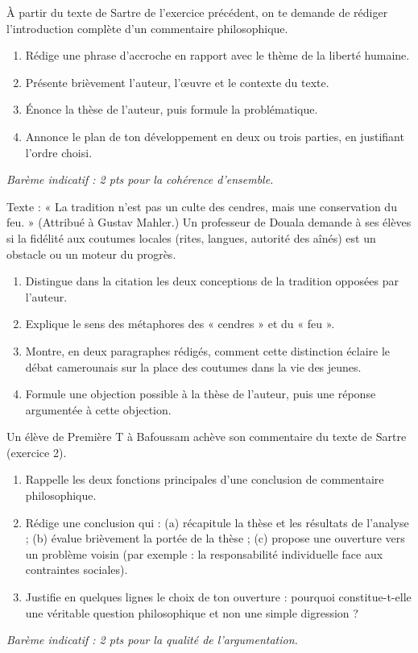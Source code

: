\documentclass[11pt]{article}
\begin{document}
\begin{exercice}
À partir du texte de Sartre de l'exercice précédent, on te demande de rédiger l'introduction complète d'un commentaire philosophique.
\begin{enumerate}
\item Rédige une phrase d'accroche en rapport avec le thème de la liberté humaine.
\item Présente brièvement l'auteur, l'œuvre et le contexte du texte.
\item Énonce la thèse de l'auteur, puis formule la problématique.
\item Annonce le plan de ton développement en deux ou trois parties, en justifiant l'ordre choisi.
\end{enumerate}
\emph{Barème indicatif : 2 pts pour la cohérence d'ensemble.}
\end{exercice}

\begin{exercice}
Texte : « La tradition n'est pas un culte des cendres, mais une conservation du feu. » (Attribué à Gustav Mahler.) Un professeur de Douala demande à ses élèves si la fidélité aux coutumes locales (rites, langues, autorité des aînés) est un obstacle ou un moteur du progrès.
\begin{enumerate}
\item Distingue dans la citation les deux conceptions de la tradition opposées par l'auteur.
\item Explique le sens des métaphores des « cendres » et du « feu ».
\item Montre, en deux paragraphes rédigés, comment cette distinction éclaire le débat camerounais sur la place des coutumes dans la vie des jeunes.
\item Formule une objection possible à la thèse de l'auteur, puis une réponse argumentée à cette objection.
\end{enumerate}
\end{exercice}

\begin{exercice}
Un élève de Première T à Bafoussam achève son commentaire du texte de Sartre (exercice 2).
\begin{enumerate}
\item Rappelle les deux fonctions principales d'une conclusion de commentaire philosophique.
\item Rédige une conclusion qui : (a) récapitule la thèse et les résultats de l'analyse ; (b) évalue brièvement la portée de la thèse ; (c) propose une ouverture vers un problème voisin (par exemple : la responsabilité individuelle face aux contraintes sociales).
\item Justifie en quelques lignes le choix de ton ouverture : pourquoi constitue-t-elle une véritable question philosophique et non une simple digression ?
\end{enumerate}
\emph{Barème indicatif : 2 pts pour la qualité de l'argumentation.}
\end{exercice}
\end{document}
